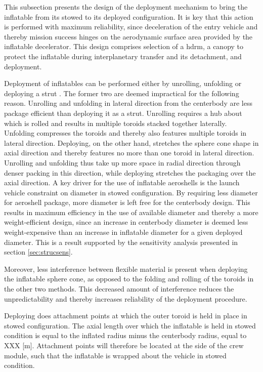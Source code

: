 This subsection presents the design of the deployment mechanism to bring the inflatable from its stowed to its deployed configuration. It is key that this action is performed with maximum reliability, since deceleration of the entry vehicle and thereby mission success hinges on the aerodynamic surface area provided by the inflatable decelerator. This design comprises selection of a \acrfull{hdrm}, a canopy to protect the inflatable during interplanetary transfer and its detachment, and deployment.

Deployment of inflatables can be performed either by unrolling, unfolding or deploying a strut \cite[p.222-227]{Jenkins2001}. The former two are deemed impractical for the following reason. Unrolling and unfolding in lateral direction from the centerbody are less package efficient than deploying it as a strut. Unrolling requires a hub about which is rolled and results in multiple toroids stacked together laterally. Unfolding compresses the toroids and thereby also features multiple toroids in lateral direction. Deploying, on the other hand, stretches the sphere cone shape in axial direction and thereby features no more than one toroid in lateral direction. Unrolling and unfolding thus take up more space in radial direction through denser packing in this direction, while deploying stretches the packaging over the axial direction. A key driver for the use of inflatable aeroshells is the launch vehicle constraint on diameter in stowed configuration. By requiring less diameter for aeroshell package, more diameter is left free for the centerbody design. This results in maximum efficiency in the use of available diameter and thereby a more weight-efficient design, since an increase in centerbody diameter is deemed less weight-expensive than an increase in inflatable diameter for a given deployed diameter. This is a result supported by the sensitivity analysis presented in section \ref{sec:strucsens}. 

Moreover, less interference between flexible material is present when deploying the inflatable sphere cone, as opposed to the folding and rolling of the toroids in the other two methods. This decreased amount of interference reduces the unpredictability and thereby increases reliability of the deployment procedure.

Deploying does attachment points at which the outer toroid is held in place in stowed configuration. The axial length over which the inflatable is held in stowed condition is equal to the inflated radius minus the centerbody radius, equal to XXX [m]. Attachment points will therefore be located at the side of the crew module, such that the inflatable is wrapped about the vehicle in stowed condition. 

